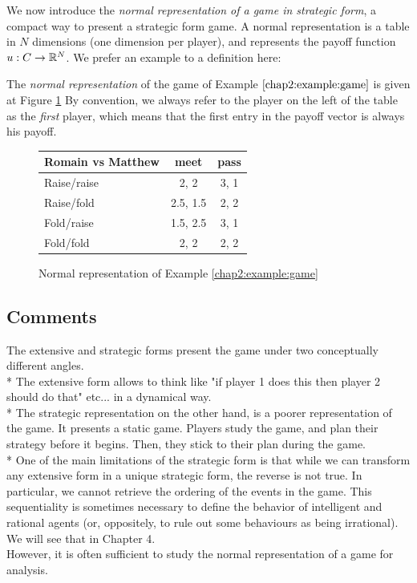 We now introduce the
 \emph{normal representation of a game in strategic form}, 
a compact way to present a strategic form game. 
A normal representation is a table in $N$ dimensions
 (one dimension per player), 
 and represents the payoff function 
 $u : C \rightarrow \mathbb{R}^N$.  
 We prefer an example to a definition here:
\begin{example}
The \emph{normal representation} of the game of Example $\ref{chap2:example:game}$ is given at Figure \ref{chap2:table}
By convention, we always refer to the player on the left of the table as the \emph{first} player, 
which means that the first entry in the payoff vector is always his payoff.
\begin{figure}[!ht]
\centering
\begin{tabular}{l|cc}
Romain vs Matthew & meet & pass \\
\hline
Raise/raise & 2, 2 & 3, 1 \\
Raise/fold & 2.5, 1.5 & 2, 2 \\
Fold/raise & 1.5, 2.5 & 3, 1 \\
Fold/fold & 2, 2 & 2, 2 
\end{tabular}
\caption{Normal representation of Example \ref{chap2:example:game}}
\label{chap2:table}
\end{figure}

\end{example}



\subsection{Comments}

The extensive and strategic forms present the game under two conceptually different angles.\\* 
The extensive form  allows to think like "if player 1 does this then player 2 should do that" etc... in a dynamical way. \\*
The strategic representation on the other hand, is a poorer representation of the game. It presents a static game. Players study the game, and plan their strategy before it begins. Then, they stick to their plan during the game.\\*
One of the main limitations of the strategic form is that while we can transform any extensive form in a unique strategic form, the reverse is not true. In particular, we cannot retrieve the ordering of the events in the game. 
This sequentiality is sometimes necessary to define the behavior of intelligent and rational agents (or, oppositely, to rule out some behaviours as being irrational).  We will see that in Chapter 4. \\
However, it is often sufficient to study the normal representation of a game for analysis. 

